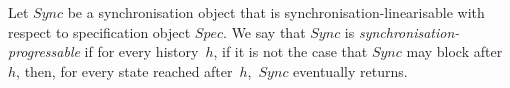 \begin{definition}
Let $Sync$ be a synchronisation object that is synchronisation-linearisable
with respect to specification object $Spec$.  We say that $Sync$ is
\emph{synchronisation-progressable} if for every history~$h$, if it is not the
case that $Sync$ may block after~$h$, then, for every state reached
after~$h$,\, $Sync$ eventually returns.
\end{definition}





